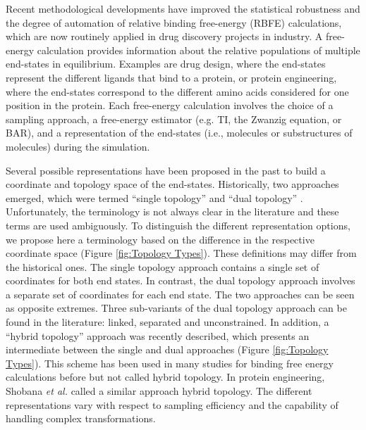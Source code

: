 Recent methodological developments have improved the statistical robustness and the degree of automation of relative binding free-energy (RBFE) calculations, which are now routinely applied in drug discovery projects in industry. 
\cite{Cournia2017,Cournia2020, Meier2021, Armacost2020, Barros2022,  Heinzelmann2021, Gapsys2020, Jespers2019, Raman2020, Christ2014, Gao2018, Tielker2021, Loeffler2018}
%
A free-energy calculation provides information about the relative populations of multiple end-states in equilibrium. Examples are drug design, where the end-states represent the different ligands that bind to a protein, \cite{Christ2009, Riniker2011, Wang2015, Wang2017, Aldeghi2016, Sidler2016,Yu2017, Jespers2019,Jiang2019, Paulsen2020} or protein engineering, where the end-states correspond to the different amino acids considered for one position in the protein.\cite{Shobana2000, Bieler2015B, Jespers2019B}
Each free-energy calculation involves the choice of a sampling approach, a free-energy estimator (e.g. TI,\cite{Kirkwood1935} the Zwanzig equation,\cite{Zwanzig1954} or BAR\cite{Bennett1976}), and a representation of the end-states (i.e., molecules or substructures of molecules) during the simulation.

Several possible representations have been proposed in the past to build a coordinate and topology space of the end-states. 
Historically, two approaches emerged, which were termed ``single topology'' \cite{Pearlman1991, Pearlman1994} and ``dual topology'' \cite{Pearlman1991, Gao1989}.
Unfortunately, the terminology is not always clear in the literature and these terms are used ambiguously.\cite{Boresch1999, Rocklin2013, Fleck2021}
To distinguish the different representation options, we propose here a terminology based on the difference in the respective coordinate space (Figure \ref{fig:Topology Types}). These definitions may differ from the historical ones. The single topology approach contains a single set of coordinates for both end states. In contrast,  the dual topology approach involves a separate set of coordinates for each end state. The two approaches can be seen as opposite extremes. Three sub-variants of the dual topology approach can be found in the literature: linked, separated and unconstrained.
In addition, a ``hybrid topology'' approach was recently described,\cite{Jiang2019} which presents an intermediate between the single and dual approaches (Figure \ref{fig:Topology Types}). This scheme has been used in many studies for binding free energy calculations before but not called hybrid topology. In protein engineering, Shobana \textit{et al.} \cite{Shobana2000} called a similar approach hybrid topology.\cite{Shobana2000} The different representations vary with respect to sampling efficiency and the capability of handling complex transformations.

